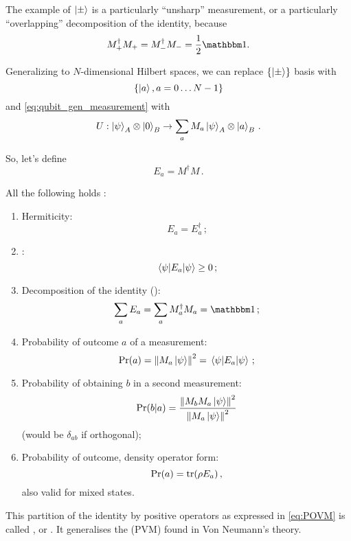 The example of $\ket{\pm}$ is a particularly ``unsharp'' measurement,
or a particularly ``overlapping'' decomposition of the identity,
because
$$M_+^{\dagger}M_+ = M_-^{\dagger}M_- = \frac{1}{2}\idop\text{.}$$

Generalizing to $N$-dimensional Hilbert spaces, we can replace
$\left\{\ket{\pm}\right\}$ basis with
\[
  \left\{\ket{a}, a = 0\ldots N-1\right\}
\]
and \eqref{eq:qubit_gen_measurement} with
\begin{equation}\label{eq:gen_measurement}
  U: \ket{\psi}_A \otimes \ket{0}_B \rightarrow \sum_a M_a\ket{\psi}_A \otimes \ket{a}_B
  \,\text{.}
\end{equation}

So, let's define
\[
  E_a = M^{\dagger}M \,\text{.}
\]

\citereset
All the following holds \parencite[sec.3.1]{PreskillNotes}:
\begin{enumerate}
  \item 
    Hermiticity: \[E_a = E_a^{\dagger}\,\text{;}\]
  \item
    : \[\expval{E_a}{\psi} \geq 0\,\text{;}\]  
  \item\label{listitem:POVM}
    Decomposition of the identity ():
    \begin{equation}\label{eq:POVM}
      \sum_a E_a = \sum_a M_a^{\dagger}M_a = \idop \,\text{;}
    \end{equation}
  \item
    Probability of outcome $a$ of a measurement:
    \[\Pr(a) = \norm{M_a\ket{\psi}}^2 = \expval{E_a}{\psi}\,\text{;}\]
  \item
    Probability of obtaining $b$ in a second measurement:
    \[\Pr(b|a) = \frac{\norm{M_bM_a\ket{\psi}}^2}{\norm{M_a\ket{\psi}}^2}\]
    (would be $\delta_{ab}$ if orthogonal);
  \item
    Probability of outcome, density operator form:
    \[\Pr(a) = \tr(\rho E_a)\,\text{,}\]
    also valid for mixed states.
\end{enumerate}

This partition of the identity by positive operators
as expressed in \eqref{eq:POVM} is called
, or .
It generalises the  (PVM)
found in Von Neumann's theory.

